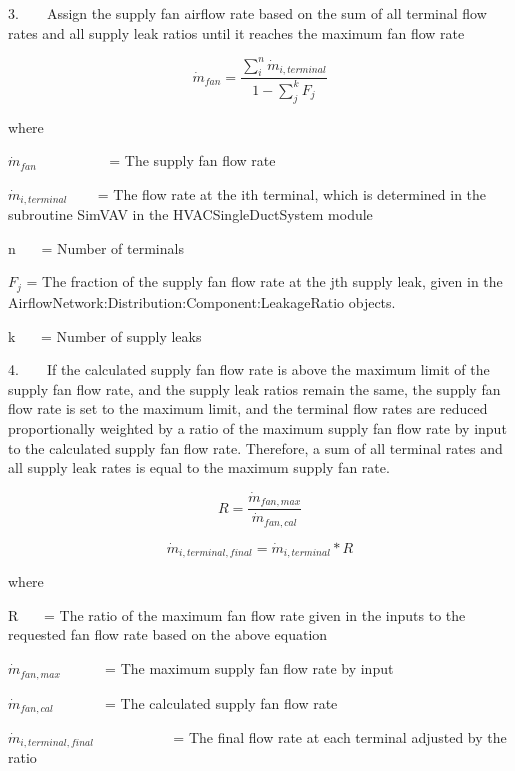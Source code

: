 3.~~~~Assign the supply fan airflow rate based on the sum of all terminal flow rates and all supply leak ratios until it reaches the maximum fan flow rate

\begin{equation}
{\dot m_{fan}} = \frac{{\mathop \sum \nolimits_i^n {{\dot m}_{i,terminal}}}}{{1 - \mathop \sum \nolimits_j^k {F_j}}}
\end{equation}

where

\({\dot m_{fan}}\) ~~~~~~~~~ = The supply fan flow rate

\({\dot m_{i,terminal}}\) ~~~ = The flow rate at the ith terminal, which is determined in the subroutine SimVAV in the HVACSingleDuctSystem module

n~~~ = Number of terminals

\({F_j}\) = The fraction of the supply fan flow rate at the jth supply leak, given in the AirflowNetwork:Distribution:Component:LeakageRatio objects.

k~~~ = Number of supply leaks

4.~~~~If the calculated supply fan flow rate is above the maximum limit of the supply fan flow rate, and the supply leak ratios remain the same, the supply fan flow rate is set to the maximum limit, and the terminal flow rates are reduced proportionally weighted by a ratio of the maximum supply fan flow rate by input to the calculated supply fan flow rate. Therefore, a sum of all terminal rates and all supply leak rates is equal to the maximum supply fan rate. \textbf{\emph{~}}

\begin{equation}
R = \frac{{{{\dot m}_{fan,max}}}}{{{{\dot m}_{fan,cal}}}}
\end{equation}

\begin{equation}
{\dot m_{i,terminal,final}} = {\dot m_{i,terminal}}*R
\end{equation}

where

R~~~ = The ratio of the maximum fan flow rate given in the inputs to the requested fan flow rate based on the above equation

\({\dot m_{fan,max}}\) ~~~~~ = The maximum supply fan flow rate by input

\({\dot m_{fan,cal}}\) ~~~~~~ = The calculated supply fan flow rate

\({\dot m_{i,terminal,final}}\) ~~~~~~~~~~ = The final flow rate at each terminal adjusted by the ratio

